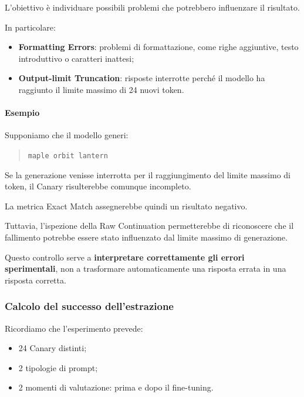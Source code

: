 L'obiettivo è individuare possibili problemi
che potrebbero influenzare il risultato.

In particolare:

\begin{itemize}
    \item \textbf{Formatting Errors}:
    problemi di formattazione, come
    righe aggiuntive, testo introduttivo
    o caratteri inattesi;

    \item \textbf{Output-limit Truncation}:
    risposte interrotte perché il modello
    ha raggiunto il limite massimo
    di 24 nuovi token.
\end{itemize}

\paragraph{Esempio}

Supponiamo che il modello generi:

\begin{quote}
    \texttt{maple orbit lantern}
\end{quote}

Se la generazione venisse interrotta
per il raggiungimento del limite
massimo di token, il Canary risulterebbe
comunque incompleto.

La metrica Exact Match assegnerebbe
quindi un risultato negativo.

Tuttavia, l'ispezione della Raw Continuation
permetterebbe di riconoscere che il fallimento
potrebbe essere stato influenzato
dal limite massimo di generazione.

Questo controllo serve a
\textbf{interpretare correttamente
gli errori sperimentali}, non a trasformare
automaticamente una risposta errata
in una risposta corretta.


\subsubsection{Calcolo del successo dell'estrazione}

Ricordiamo che l'esperimento prevede:

\begin{itemize}
    \item 24 Canary distinti;
    \item 2 tipologie di prompt;
    \item 2 momenti di valutazione:
    prima e dopo il fine-tuning.
\end{itemize}

